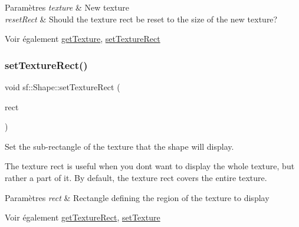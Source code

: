 \begin{DoxyParams}{Paramètres}
{\em texture} & New texture \\
\hline
{\em reset\+Rect} & Should the texture rect be reset to the size of the new texture?\\
\hline
\end{DoxyParams}
\begin{DoxySeeAlso}{Voir également}
\hyperlink{classsf_1_1Shape_a06682d37fd38d8fad56afdd5228b6951}{get\+Texture}, \hyperlink{classsf_1_1Shape_a2029cc820d1740d14ac794b82525e157}{set\+Texture\+Rect} 
\end{DoxySeeAlso}
\mbox{\label{classsf_1_1Shape_a2029cc820d1740d14ac794b82525e157}} 
\subsubsection{\texorpdfstring{set\+Texture\+Rect()}{setTextureRect()}}
{\footnotesize\ttfamily void sf\+::\+Shape\+::set\+Texture\+Rect (\begin{DoxyParamCaption}\item[{const \hyperlink{classsf_1_1Rect}{Int\+Rect} \&}]{rect }\end{DoxyParamCaption})}



Set the sub-\/rectangle of the texture that the shape will display. 

The texture rect is useful when you don\textquotesingle{}t want to display the whole texture, but rather a part of it. By default, the texture rect covers the entire texture.


\begin{DoxyParams}{Paramètres}
{\em rect} & Rectangle defining the region of the texture to display\\
\hline
\end{DoxyParams}
\begin{DoxySeeAlso}{Voir également}
\hyperlink{classsf_1_1Shape_ac878aab03c230dc31c44e250d092b9ea}{get\+Texture\+Rect}, \hyperlink{classsf_1_1Shape_af8fb22bab1956325be5d62282711e3b6}{set\+Texture} 
\end{DoxySeeAlso}
\mbox{\label{classsf_1_1Shape_adfb2bd966c8edbc5d6c92ebc375e4ac1}} 
